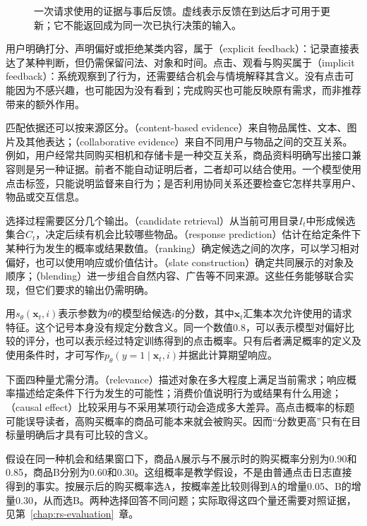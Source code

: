 \begin{figure}[htbp]
  \centering
  
  \caption{一次请求使用的证据与事后反馈。虚线表示反馈在到达后才可用于更新；它不能返回成为同一次已执行决策的输入。}
  \label{fig:rs-request-evidence}
\end{figure}

用户明确打分、声明偏好或拒绝某类内容，属于（explicit feedback）：记录直接表达了某种判断，但仍需保留问法、对象和时间。点击、观看与购买属于（implicit feedback）：系统观察到了行为，还需要结合机会与情境解释其含义。没有点击可能因为不感兴趣，也可能因为没有看到；完成购买也可能反映原有需求，而非推荐带来的额外作用。

匹配依据还可以按来源区分。（content-based evidence）来自物品属性、文本、图片及其他表达；（collaborative evidence）来自不同用户与物品之间的交互关系。例如，用户经常共同购买相机和存储卡是一种交互关系，商品资料明确写出接口兼容则是另一种证据。前者不能自动证明后者，二者却可以结合使用。一个模型使用点击标签，只能说明监督来自行为；是否利用协同关系还要检查它怎样共享用户、物品或交互信息。

选择过程需要区分几个输出。（candidate retrieval）从当前可用目录$I_t$中形成候选集合$C_t$，决定后续有机会比较哪些物品。（response prediction）估计在给定条件下某种行为发生的概率或结果数值。（ranking）确定候选之间的次序，可以学习相对偏好，也可以使用响应或价值估计。（slate construction）确定共同展示的对象及顺序；（blending）进一步组合自然内容、广告等不同来源。这些任务能够联合实现，但它们要求的输出仍需明确。

用$s_\theta(\bm{x}_t,i)$表示参数为$\theta$的模型给候选$i$的分数，其中$\bm{x}_t$汇集本次允许使用的请求特征。这个记号本身没有规定分数含义。同一个数值0.8，可以表示模型对偏好比较的评分，也可以表示经过特定训练得到的点击概率。只有后者满足概率的定义及使用条件时，才可写作$p_\theta(y=1\mid\bm{x}_t,i)$并据此计算期望响应。

下面四种量尤需分清。（relevance）描述对象在多大程度上满足当前需求；响应概率描述给定条件下行为发生的可能性；消费价值说明行为或结果有什么用途；（causal effect）比较采用与不采用某项行动会造成多大差异。高点击概率的标题可能误导读者，高购买概率的商品可能本来就会被购买。因而“分数更高”只有在目标量明确后才具有可比较的含义。

\begin{example}[高响应与高增量可以指向不同对象]
  \label{ex:rs-response-effect}
  假设在同一种机会和结果窗口下，商品A展示与不展示时的购买概率分别为0.90和0.85，商品B分别为0.60和0.30。这组概率是教学假设，不是由普通点击日志直接得到的事实。按展示后的购买概率选A，按概率差比较则得到A的增量0.05、B的增量0.30，从而选B。两种选择回答不同问题；实际取得这四个量还需要对照证据，见第~\ref{chap:rs-evaluation}~章。
\end{example}

